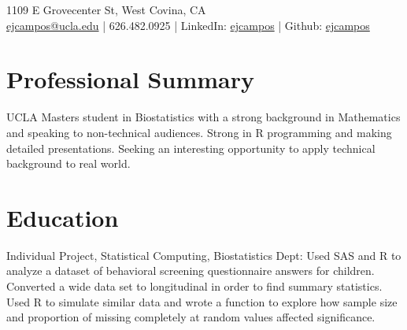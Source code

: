 \documentclass[]{deedy-resume-openfont}
\begin{document}
\lastupdated

 { 
1109 E Grovecenter St, West Covina, CA \\
\href{mailto:ejcampos@ucla.edu}{ejcampos@ucla.edu} | 626.482.0925 | LinkedIn: \href{https://www.linkedin.com/in/ejcampos/}{ejcampos} | Github: \href{https://www.github.com/ejcampos/}{ejcampos}
}

\section{Professional Summary} 
\begin{flushleft}
UCLA Masters student in Biostatistics with a strong background in Mathematics and speaking to non-technical audiences. Strong in R programming and making detailed presentations. Seeking an interesting opportunity to apply technical background to real world.
\end{flushleft}

\section{Education} 

\vspace{-.25em}
\begin{tightemize} 
\item Individual Project, Statistical Computing, Biostatistics Dept: Used SAS and R to analyze a dataset of behavioral screening questionnaire answers for children. Converted a wide data set to longitudinal in order to find summary statistics. Used R to simulate similar data and wrote a function to explore how sample size and proportion of missing completely at random values affected significance.
\end{tightemize}
\sectionsep
\end{document}
